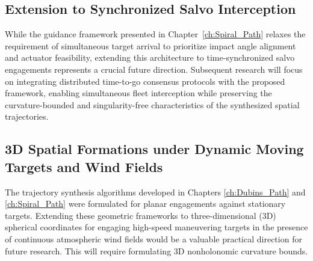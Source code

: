 \subsection{Extension to Synchronized Salvo Interception}
While the guidance framework presented in Chapter~\ref{ch:Spiral_Path} relaxes the requirement of simultaneous target arrival to prioritize impact angle alignment and actuator feasibility, extending this architecture to time-synchronized salvo engagements represents a crucial future direction. Subsequent research will focus on integrating distributed time-to-go consensus protocols with the proposed framework, enabling simultaneous fleet interception while preserving the curvature-bounded and singularity-free characteristics of the synthesized spatial trajectories.

\subsection{3D Spatial Formations under Dynamic Moving Targets and Wind Fields}
The trajectory synthesis algorithms developed in Chapters \ref{ch:Dubins_Path} and \ref{ch:Spiral_Path} were formulated for planar engagements against stationary targets. Extending these geometric frameworks to three-dimensional (3D) spherical coordinates for engaging high-speed maneuvering targets in the presence of continuous atmospheric wind fields would be a valuable practical direction for future research. This will require formulating 3D nonholonomic curvature bounds.
